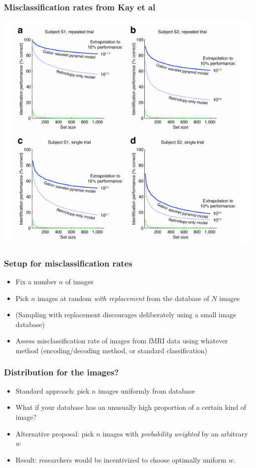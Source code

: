 \documentclass{beamer}
\begin{document}
\begin{frame}
\frametitle{Misclassification rates from Kay et al}
\begin{center}
\includegraphics[scale=0.3]{kay_screenshot.png}
\end{center}
\end{frame}

\begin{frame}
\frametitle{Setup for misclassification rates}
\begin{itemize}
\item Fix a number $n$ of images
\item Pick $n$ images at random \emph{with replacement} from the
  database of $N$ images
\item (Sampling with replacement discourages deliberately using a
  small image database)
\item Assess misclassification rate of images from fMRI data using
  whatever method (encoding/decoding method, or standard
  classification)
\end{itemize}
\end{frame}

\begin{frame}
\frametitle{Distribution for the images?}
\begin{itemize}
\item Standard approach: pick $n$ images uniformly from database
\item What if your database has an unusually high proportion of a
  certain kind of image?
\item Alternative proposal: pick $n$ images with \emph{probability
  weighted} by an arbitrary $w$
\item Result: researchers would be incentivized to choose optimally
  uniform $w$.
\end{itemize}
\end{frame}
\end{document}
